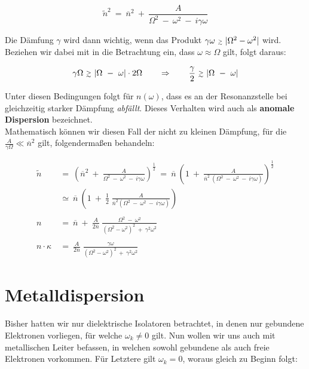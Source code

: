 \begin{equation*}
\tilde{n}^2  \ = \  \overline{n}^2 \ + \ \frac{A}{\Omega^2 \ - \ \omega^2 \ - \ i\gamma\omega}
\end{equation*}

Die Dämfung $\gamma$ wird dann wichtig, wenn das Produkt $\gamma\omega \ \mathsmaller{\mathsmaller{\gtrsim}} \ |\Omega^2 - \omega^2|$ wird. Beziehen wir dabei mit in die Betrachtung ein, dass $\omega\approx\Omega$ gilt, folgt daraus:

\begin{equation*}
\gamma\Omega \ \mathsmaller{\mathsmaller{\gtrsim}} \ |\Omega \ - \ \omega| \cdot 2\Omega \qquad \Rightarrow \qquad \frac{\gamma}{2} \ \mathsmaller{\mathsmaller{\gtrsim}} \ |\Omega \ - \ \omega|
\end{equation*}

Unter diesen Bedingungen folgt für $n(\omega)$, dass es an der Resonanzstelle bei gleichzeitig starker Dämpfung \emph{abfällt}. Dieses Verhalten wird auch als \textbf{anomale Dispersion} bezeichnet.\\
Mathematisch können wir diesen Fall der nicht zu kleinen Dämpfung, für die $\frac{A}{\gamma\Omega}\ll \overline{n}^2$ gilt, folgendermaßen behandeln:

\begin{align*}
\tilde{n} \ &= \ \left(\overline{n}^2 \ + \ \frac{A}{\Omega^2 \ - \ \omega^2 \ - \ i \gamma\omega}\right)^{\frac{1}{2}}  \ = \  \overline{n} \  \left( 1 \ + \ \frac{A}{\overline{n}^2 \ \left(\Omega^2 \ - \ \omega^2 \ - \ i \gamma \omega\right)}\right)^{\frac{1}{2}}\\
&\simeq \ \overline{n} \ \left(1 \ + \ \frac{1}{2}\;\frac{A}{\overline{n}^2\left(\Omega^2 \ - \ \omega^2 \ - \ i \gamma\omega\right)}\right)\\
\ \\
n  \ &= \ \overline{n} \ + \ \frac{A}{2\overline{n}} \; \frac{\Omega^2 \ - \ \omega^2}{\left(\Omega^2-\omega^2\right)^2 \ + \ \gamma^2\omega^2}\\
\ \\
n \cdot \kappa  \ &= \ \frac{A}{2\overline{n}} \; \frac{\gamma\omega}{\left(\Omega^2-\omega^2\right)^2 \ + \ \gamma^2\omega^2} 
\end{align*}

\section{Metalldispersion}

Bisher hatten wir nur dielektrische Isolatoren betrachtet, in denen nur gebundene Elektronen vorliegen, für welche $\omega_k \neq 0$ gilt. Nun wollen wir uns auch mit metallischen Leiter befassen, in welchen sowohl gebundene als auch freie Elektronen vorkommen. Für Letztere gilt $\omega_k = 0$, woraus gleich zu Beginn folgt:


